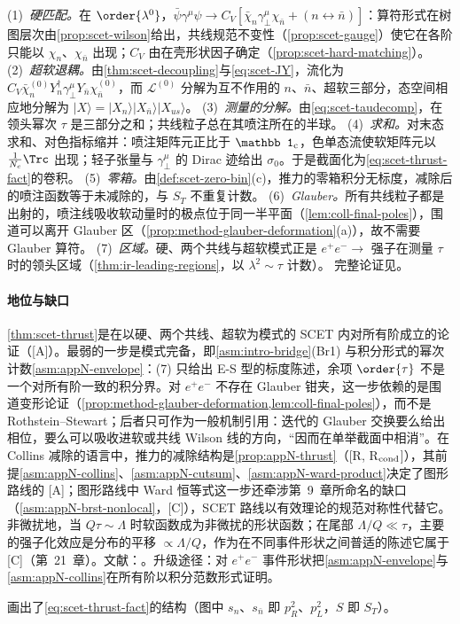 \begin{proofsketch}
(1)~\emph{硬匹配。}在 $\order{\lambda^0}$，$\bar\psi\gamma^\mu\psi\to C_V[\bar\chi_n\gamma_\perp^\mu\chi_{\bar n}+(n\leftrightarrow\bar n)]$：算符形式在树图层次由\cref{prop:scet-wilson}给出，共线规范不变性（\cref{prop:scet-gauge}）使它在各阶只能以 $\chi_n$、$\chi_{\bar n}$ 出现；$C_V$ 由在壳形状因子确定（\cref{prop:scet-hard-matching}）。
(2)~\emph{超软退耦。}由\cref{thm:scet-decoupling}与\cref{eq:scet-JY}，流化为 $C_V\bar\chi^{(0)}_nY_n^\dagger\gamma_\perp^\mu Y_{\bar n}\chi^{(0)}_{\bar n}$，而 $\mathcal L^{(0)}$ 分解为互不作用的 $n$、$\bar n$、超软三部分，态空间相应地分解为 $|X\rangle=|X_n\rangle|X_{\bar n}\rangle|X_{us}\rangle$。
(3)~\emph{测量的分解。}由\cref{eq:scet-taudecomp}，在领头幂次 $\tau$ 是三部分之和；共线粒子总在其喷注所在的半球。
(4)~\emph{求和。}对末态求和、对色指标缩并：喷注矩阵元正比于 $\mathbb 1_{\rm c}$，色单态流使软矩阵元以 $\frac1{N_c}\Trc$ 出现；轻子张量与 $\gamma_\perp^\mu$ 的 Dirac 迹给出 $\sigma_0$。于是截面化为\cref{eq:scet-thrust-fact}的卷积。
(5)~\emph{零箱。}由\cref{def:scet-zero-bin}(c)，推力的零箱积分无标度，减除后的喷注函数等于未减除的，与 $S_T$ 不重复计数。
(6)~\emph{Glauber。}所有共线粒子都是出射的，喷注线吸收软动量时的极点位于同一半平面（\cref{lem:coll-final-poles}），围道可以离开 Glauber 区（\cref{prop:method-glauber-deformation}(a)），故不需要 Glauber 算符。
(7)~\emph{区域。}硬、两个共线与超软模式正是 $e^+e^-\to$ 强子在测量 $\tau$ 时的领头区域（\cref{thm:ir-leading-regions}，以 $\lambda^2\sim\tau$ 计数）。
完整论证见\cite{Bauer:2003di,Fleming:2007qr,Schwartz:2007ib,Fleming:2007xt,BecherSchwartz2008,Bauer:2008dt}。
\end{proofsketch}

\paragraph{地位与缺口}
\cref{thm:scet-thrust}是在以硬、两个共线、超软为模式的 SCET 内对所有阶成立的论证（[A]）。最弱的一步是模式完备，即\cref{asm:intro-bridge}(Br1) 与积分形式的幂次计数\cref{asm:appN-envelope}：(7) 只给出 E-S 型的标度陈述，余项 $\order{\tau}$ 不是一个对所有阶一致的积分界。对 $e^+e^-$ 不存在 Glauber 钳夹，这一步依赖的是围道变形论证（\cref{prop:method-glauber-deformation,lem:coll-final-poles}），而不是 Rothstein--Stewart；后者只可作为一般机制引用：迭代的 Glauber 交换要么给出相位，要么可以吸收进软或共线 Wilson 线的方向，“因而在单举截面中相消”\cite{RothsteinStewart2016}。在 Collins 减除的语言中，推力的减除结构是\cref{prop:appN-thrust}（[R, R$_{\rm cond}$]），其前提\cref{asm:appN-collins}、\cref{asm:appN-cutsum}、\cref{asm:appN-ward-product}决定了图形路线的 [A]；图形路线中 Ward 恒等式这一步还牵涉第~9~章所命名的缺口（\cref{asm:appN-brst-nonlocal}，[C]），SCET 路线以有效理论的规范对称性代替它。非微扰地，当 $Q\tau\sim\Lambda$ 时软函数成为非微扰的形状函数\cite{Korchemsky:1994is,Korchemsky:1999kt,Bauer:2003di}；在尾部 $\Lambda/Q\ll\tau$，主要的强子化效应是分布的平移 $\propto\Lambda/Q$，作为在不同事件形状之间普适的陈述它属于 [C]（第~21~章）。文献：\cite{Bauer:2003di,Lee:2006nr,Fleming:2007qr,Schwartz:2007ib,Fleming:2007xt,BecherSchwartz2008,Bauer:2008dt}。升级途径：对 $e^+e^-$ 事件形状把\cref{asm:appN-envelope}与\cref{asm:appN-collins}在所有阶以积分范数形式证明。

画出了\cref{eq:scet-thrust-fact}的结构（图中 $s_n$、$s_{\bar n}$ 即 $p_R^2$、$p_L^2$，$S$ 即 $S_T$）。

